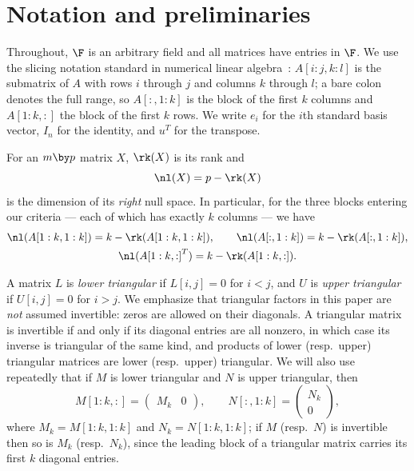 \section{Notation and preliminaries}\label{sec:notation}

Throughout, $\F$ is an arbitrary field and all matrices have entries in
$\F$.  We use the slicing notation standard in numerical linear
algebra~\cite{golub_matrix_2013}: $A[i:j, k:l]$ is the submatrix of $A$ with
rows $i$ through $j$ and columns $k$ through $l$; a bare colon denotes the
full range, so $A[:,1:k]$ is the block of the first $k$ columns and
$A[1:k,:]$ the block of the first $k$ rows.  We write $e_i$ for the $i$th
standard basis vector, $I_n$ for the identity, and $u^T$ for the transpose.

For an $m \by p$ matrix $X$, $\rk(X)$ is its rank and
\[
  \nl(X) = p - \rk(X)
\]
is the dimension of its \emph{right} null space.  In particular, for the
three blocks entering our criteria --- each of which has exactly $k$ columns
--- we have
\begin{gather*}
  \nl(A[1:k,1:k]) = k - \rk(A[1:k,1:k]),
  \qquad
  \nl(A[:,1:k]) = k - \rk(A[:,1:k]),\\
  \nl({A[1:k,:]}^T) = k - \rk(A[1:k,:]) .
\end{gather*}

A matrix $L$ is \emph{lower triangular} if $L[i,j] = 0$ for $i < j$, and $U$
is \emph{upper triangular} if $U[i,j] = 0$ for $i > j$.  We emphasize that
triangular factors in this paper are \emph{not} assumed invertible: zeros are
allowed on their diagonals.  A triangular matrix is invertible if and only if
its diagonal entries are all nonzero, in which case its inverse is triangular
of the same kind, and products of lower (resp.\ upper) triangular matrices
are lower (resp.\ upper) triangular.  We will also use repeatedly that if
$M$ is lower triangular and $N$ is upper triangular, then
\begin{equation}\label{eq:tri-slices}
  M[1:k,:] =
  \begin{pmatrix}
    M_k & 0
  \end{pmatrix},
  \qquad
  N[:,1:k] =
  \begin{pmatrix}
    N_k \\ 0
  \end{pmatrix},
\end{equation}
where $M_k = M[1:k,1:k]$ and $N_k = N[1:k,1:k]$; if $M$ (resp.\ $N$) is
invertible then so is $M_k$ (resp.\ $N_k$), since the leading block of a
triangular matrix carries its first $k$ diagonal entries.

